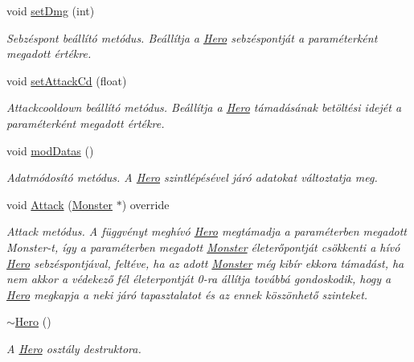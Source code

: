 \begin{DoxyCompactItemize}
void \hyperlink{classHero_a367347243a9066b06ccfc766dbac6e56}{set\+Dmg} (int)
\begin{DoxyCompactList}\small\item\em Sebzéspont beállító metódus. Beállítja a \hyperlink{classHero}{Hero} sebzéspontját a paraméterként megadott értékre. \end{DoxyCompactList}\item 
void \hyperlink{classHero_a1cc85148b78583aa9dbad3bc5aff140c}{set\+Attack\+Cd} (float)
\begin{DoxyCompactList}\small\item\em Attackcooldown beállító metódus. Beállítja a \hyperlink{classHero}{Hero} támadásának betöltési idejét a paraméterként megadott értékre. \end{DoxyCompactList}\item 
\mbox{\label{classHero_ade2f8025cdd571870f5855567a1058b9}} 
void \hyperlink{classHero_ade2f8025cdd571870f5855567a1058b9}{mod\+Datas} ()
\begin{DoxyCompactList}\small\item\em Adatmódosító metódus. A \hyperlink{classHero}{Hero} szintlépésével járó adatokat változtatja meg. \end{DoxyCompactList}\item 
void \hyperlink{classHero_a4c2c5bcf53b4fa4cb931d9930e3f0844}{Attack} (\hyperlink{classMonster}{Monster} $\ast$) override
\begin{DoxyCompactList}\small\item\em Attack metódus. A függvényt meghívó \hyperlink{classHero}{Hero} megtámadja a paraméterben megadott Monster-\/t, így a paraméterben megadott \hyperlink{classMonster}{Monster} életerőpontját csökkenti a hívó \hyperlink{classHero}{Hero} sebzéspontjával, feltéve, ha az adott \hyperlink{classMonster}{Monster} még kibír ekkora támadást, ha nem akkor a védekező fél életerpontját 0-\/ra állítja továbbá gondoskodik, hogy a \hyperlink{classHero}{Hero} megkapja a neki járó tapasztalatot és az ennek köszönhető szinteket. \end{DoxyCompactList}\item 
\mbox{\label{classHero_a5aeef41ede5a80dc29c5acd7b553c4da}} 
\hyperlink{classHero_a5aeef41ede5a80dc29c5acd7b553c4da}{$\sim$\+Hero} ()
\begin{DoxyCompactList}\small\item\em A \hyperlink{classHero}{Hero} osztály destruktora. \end{DoxyCompactList}\end{DoxyCompactItemize}
